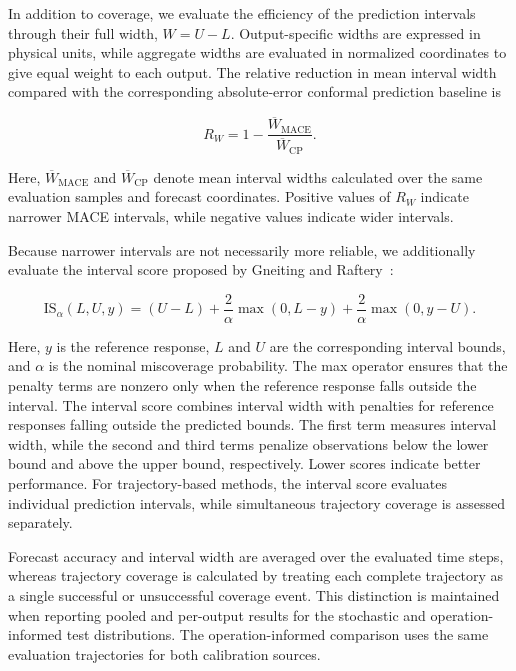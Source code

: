 In addition to coverage, we evaluate the efficiency of the prediction intervals through their full width, $W=U-L$. Output-specific widths are expressed in physical units, while aggregate widths are evaluated in normalized coordinates to give equal weight to each output. The relative reduction in mean interval width compared with the corresponding absolute-error conformal prediction baseline is

\begin{equation}
 R_W=1-
 \frac{\overline W_{\mathrm{MACE}}}
 {\overline W_{\mathrm{CP}}}.
 \label{eq:mace:widthratio}
\end{equation}

Here, $\overline W_{\mathrm{MACE}}$ and $\overline W_{\mathrm{CP}}$ denote mean interval widths calculated over the same evaluation samples and forecast coordinates. Positive values of $R_W$ indicate narrower MACE intervals, while negative values indicate wider intervals.

Because narrower intervals are not necessarily more reliable, we additionally evaluate the interval score proposed by Gneiting and Raftery~\cite{gneiting2007scoring}:

\begin{equation}
\mathrm{IS}_{\alpha}(L,U,y)=
(U-L)
+\frac{2}{\alpha}\max(0,L-y)
+\frac{2}{\alpha}\max(0,y-U).
\label{eq:mace:intervalscore}
\end{equation}

Here, $y$ is the reference response, $L$ and $U$ are the corresponding interval bounds, and $\alpha$ is the nominal miscoverage probability. The max operator ensures that the penalty terms are nonzero only when the reference response falls outside the interval. The interval score combines interval width with penalties for reference responses falling outside the predicted bounds. The first term measures interval width, while the second and third terms penalize observations below the lower bound and above the upper bound, respectively. Lower scores indicate better performance. For trajectory-based methods, the interval score evaluates individual prediction intervals, while simultaneous trajectory coverage is assessed separately.

Forecast accuracy and interval width are averaged over the evaluated time steps, whereas trajectory coverage is calculated by treating each complete trajectory as a single successful or unsuccessful coverage event. This distinction is maintained when reporting pooled and per-output results for the stochastic and operation-informed test distributions. The operation-informed comparison uses the same evaluation trajectories for both calibration sources.

